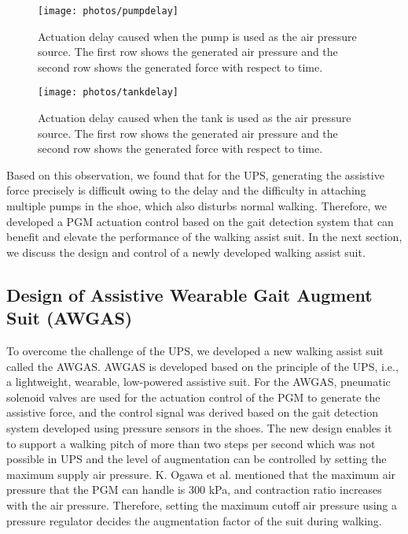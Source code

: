 \documentclass[paper,JRM,paper]{jaciiiarticle}
\begin{document}
\begin{figure}[h]
	\centering
	\texttt{[image: photos/pumpdelay]}
	\caption{Actuation delay caused when the pump is used as the air pressure source. The first row shows the generated air pressure and the second row shows the generated force with respect to time.}
	\label{fig:pump}
\end{figure}

\begin{figure}
	\centering
	\texttt{[image: photos/tankdelay]}
	\caption{Actuation delay caused when the tank is used as the air pressure source. The first row shows the generated air pressure and the second row shows the generated force with respect to time.}
	\label{fig:tank}
\end{figure}

Based on this observation, we found that for the UPS, generating the assistive force precisely is difficult owing to the delay and the difficulty in attaching multiple pumps in the shoe, which also disturbs normal walking. Therefore, we developed a PGM actuation control based on the gait detection system that can benefit and elevate the performance of the walking assist suit. In the next section, we discuss the design and control of a newly developed walking assist suit.

\subsection{Design of Assistive Wearable Gait Augment Suit (AWGAS)}
To overcome the challenge of the UPS, we developed a new walking assist suit called the AWGAS. AWGAS is developed based on the principle of the UPS, i.e., a lightweight, wearable, low-powered assistive suit. For the AWGAS, pneumatic solenoid valves are used for the actuation control of the PGM to generate the assistive force, and the control signal was derived based on the gait detection system developed using pressure sensors in the shoes. The new design enables it to support a walking pitch of more than two steps per second which was not possible in UPS \cite{13} and the level of augmentation can be controlled by setting the maximum supply air pressure.  K. Ogawa et al. mentioned that the maximum air pressure that the PGM can handle is 300 kPa, and contraction ratio increases with the air pressure. Therefore, setting the maximum cutoff air pressure using a pressure regulator decides the augmentation factor of the suit during walking. 
\end{document}
